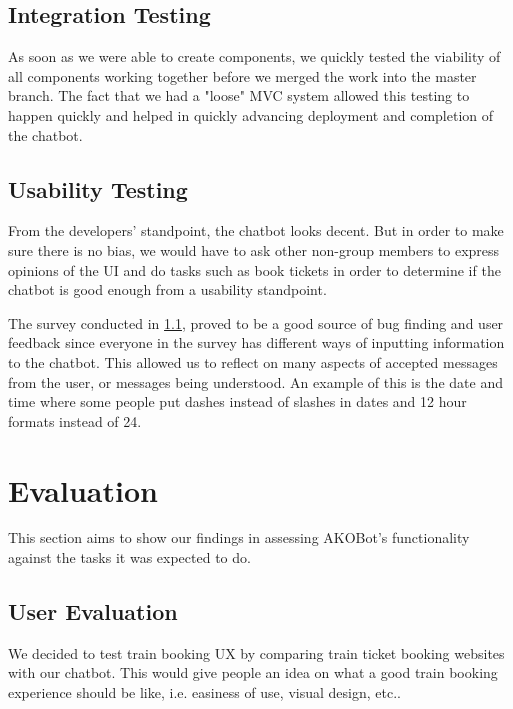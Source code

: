 \documentclass[11pt]{article}
\begin{document}
\subsection{Integration Testing}

As soon as we were able to create components, we quickly tested the viability of all components working together before we merged the work into the master branch. The fact that we had a "loose" MVC system allowed this testing to happen quickly and helped in quickly advancing deployment and completion of the chatbot.


\subsection{Usability Testing}

From the developers' standpoint, the chatbot looks decent. But in order to make sure there is no bias, we would have to ask other non-group members to express opinions of the UI and do tasks such as book tickets in order to determine if the chatbot is good enough from a usability standpoint.

The survey conducted in \cref{sec:UserEval}, proved to be a good source of bug finding and user feedback since everyone in the survey has different ways of inputting information to the chatbot. This allowed us to reflect on many aspects of accepted messages from the user, or messages being understood. An example of this is the date and time where some people put dashes instead of slashes in dates and 12 hour formats instead of 24.

\section{Evaluation}
This section aims to show our findings in assessing AKOBot's functionality against the tasks it was expected to do.

    \subsection{User Evaluation}\label{sec:UserEval}
    We decided to test train booking UX by comparing train ticket booking websites with our chatbot. This would give people an idea on what a good train booking experience should be like, i.e. easiness of use, visual design, etc..
    
\end{document}
